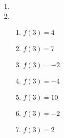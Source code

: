 \documentclass[a4paper]{article}
\begin{document}
\begin{enumerate}
\item %

\item %
  \begin{enumerate}
  \item $f(3) = 4$
  \item $f(3) = 7$
  \item $f(3) = -2$
  \item $f(3) = -4$
  \item $f(3) = 10$
  \item $f(3) = -2$
  \item $f(3) = 2$
  \end{enumerate}




\end{enumerate}
\end{document}
